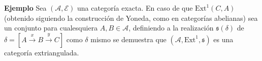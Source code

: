 \documentclass[preview]{standalone}
\begin{document}
\begin{center}
\justifying \textbf{Ejemplo} Sea $(\mathscr{A},\mathscr{E})$ una categoría exacta. En caso de que $\text{Ext}^1(C,A)$ (obtenido siguiendo la construcción de Yoneda, como en categorías abelianas) sea un conjunto para cualesquiera $A,B\in\mathscr{A}$, definiendo a la realización $\mathfrak{s}(\delta)$ de $\delta=[A\xrightarrow{x} B\xrightarrow{y} C]$ como $\delta$ mismo se demuestra que $(\mathscr{A}, \text{Ext}^1, \mathfrak{s})$ es una categoría extriangulada.
\end{center}
\end{document}
